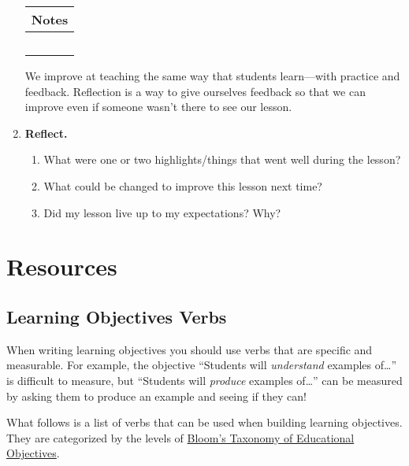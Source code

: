 \documentclass{book}
\begin{document}
\begin{enumerate}
		\begin{tabularx}{\textwidth}{|X|}
			\hline
			Notes\\
			\hline
				\rule[-.3\baselineskip]{0pt}{3cm}~\\
			\hline
		\end{tabularx}

	\newpage
	We improve at teaching the same way that students learn---with practice and feedback. Reflection is a way
	to give ourselves feedback so that we can improve even if someone wasn't there to see our lesson.

	\item \textbf{Reflect.} 
	\begin{enumerate}
		\item What were one or two highlights/things that went well during the lesson?
		\item What could be changed to improve this lesson next time? 
		\item Did my lesson live up to my expectations? Why?
	\end{enumerate}
\end{enumerate}

\newpage
\section*{Resources}
\subsection*{Learning Objectives Verbs}
When writing learning objectives you should use verbs that are specific and measurable. For example, 
the objective ``Students will \emph{understand} examples of\ldots'' is difficult to measure, but
``Students will \emph{produce} examples of\ldots'' can be measured by asking them to produce an example and
seeing if they can!

What follows is a list of verbs that can be used when building learning objectives. They are categorized by the levels of 
\href{https://en.wikipedia.org/wiki/Bloom\%27s_taxonomy}{Bloom's Taxonomy of Educational Objectives}.
\end{document}
